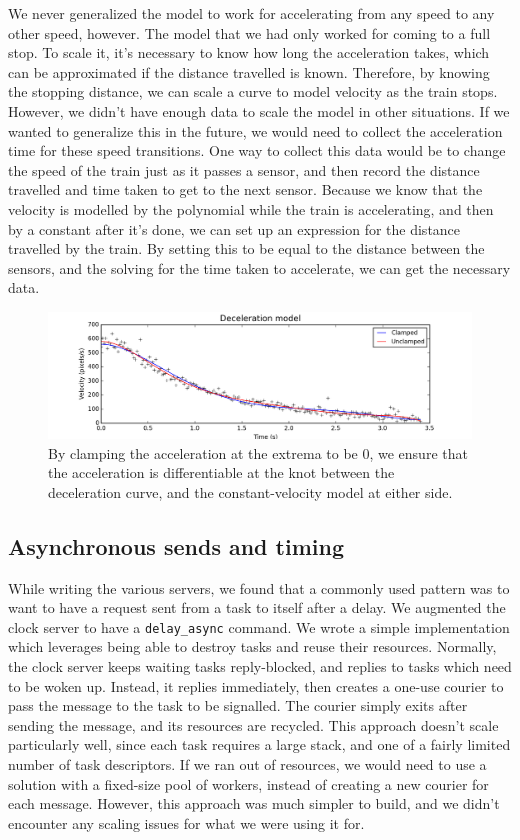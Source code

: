 \documentclass{article}
\begin{document}
We never generalized the model to work for accelerating from any
speed to any other speed, however.
The model that we had only worked for coming to a full stop.
To scale it, it's necessary to know how long the acceleration takes,
which can be approximated if the distance travelled is known.
Therefore, by knowing the stopping distance, we can scale a curve
to model velocity as the train stops.
However, we didn't have enough data to scale the model in other
situations.
If we wanted to generalize this in the future, we would need to collect the acceleration time for these speed transitions.
One way to collect this data would be to change the speed of
the train just as it passes a sensor, and then record
the distance travelled and time taken to get to the next sensor.
Because we know that the velocity is modelled by the polynomial while
the train is accelerating, and then by a constant after it's done,
we can set up an expression for the distance travelled by the train.
By setting this to be equal to the distance between the sensors, and the solving for the time taken to accelerate, we can get the necessary data.

\begin{figure}
\caption{By clamping the acceleration at the extrema to be 0, we ensure that
the acceleration is differentiable at the knot between the deceleration curve,
and the constant-velocity model at either side.}
\label{fig:deceleration}
\includegraphics[width=\linewidth]{deceleration.png}
\end{figure}

\subsection{Asynchronous sends and timing}
While writing the various servers, we found that a commonly used pattern was to want to have a request sent from a task
to itself after a delay.
We augmented the clock server to have a \texttt{delay\_async} command.
We wrote a simple implementation which leverages being able to destroy tasks and reuse their resources.
Normally, the clock server keeps waiting tasks reply-blocked, and replies to tasks which need to be woken up.
Instead, it replies immediately, then creates a one-use courier to pass the message to the task to be signalled.
The courier simply exits after sending the message, and its resources are recycled.
This approach doesn't scale particularly well, since each task requires a large stack, and one of a fairly limited number of task descriptors.
If we ran out of resources, we would need to use a solution with a fixed-size pool of workers, instead of
creating a new courier for each message.
However, this approach was much simpler to build, and we didn't encounter any scaling issues for what we were
using it for.
\end{document}
